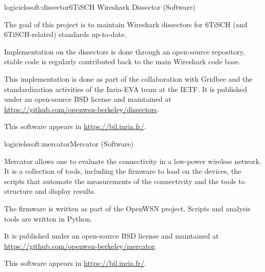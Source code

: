 \documentclass{ra2016}
\begin{document}
\begin{module}{logiciels}{soft:dissector}{6TiSCH Wireshark Dissector (Software)}

\begin{participants}
\end{participants}

The goal of this project is to maintain Wireshark dissectors for 6TiSCH (and 6TiSCH-related) standards up-to-date.

Implementation on the dissectors is done through an open-source repository, stable code is regularly contributed back to the main Wireshark code base.

This implementation is done as part of the collaboration with Gridbee and the standardization activities of the Inria-EVA team at the IETF.
It is published under an open-source BSD license and maintained at \url{https://github.com/openwsn-berkeley/dissectors}.

This software appears in \url{https://bil.inria.fr/}.

\end{module}

\begin{module}{logiciels}{soft:mercator}{Mercator (Software)}
\label{soft:mercator}

\begin{participants}
\end{participants}

Mercator allows one to evaluate the connectivity in a low-power wireless network.
It is a collection of tools, including the firmware to load on the devices, the scripts that automate the measurements of the connectivity and the tools to structure and display results.

The firmware is written as part of the OpenWSN project.
Scripts and analysis tools are written in Python.

It is published under an open-source BSD license and maintained at \url{https://github.com/openwsn-berkeley/mercator}.

This software appears in \url{https://bil.inria.fr/}.

\end{module}
\end{document}
